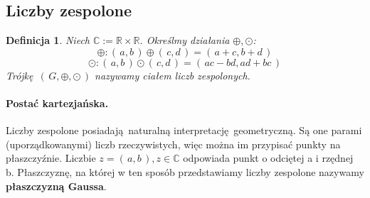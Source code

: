 \documentclass{article}
\newtheorem{definition}{Definicja}[section]
\begin{document}
    \subsection{Liczby zespolone}
    \begin{definition}
        Niech $\mathds{C} := \mathds{R} \times \mathds{R}$. Określmy działania $\oplus ,\odot$:
        \begin{equation*}
            \oplus : (\,a,b\,)\oplus(\,c,d\,) = (\,a+c, b+d\,)
        \end{equation*}
        \begin{equation*}
            \odot : (\,a,b\,)\odot(\,c,d\,) = (\, ac-bd, ad+bc\,)
        \end{equation*}
        Trójkę $(\,G,\oplus,\odot\,)$ nazywamy ciałem liczb zespolonych.
    \end{definition}

    \paragraph{Postać kartezjańska.} Liczby zespolone posiadają naturalną interpretację geometryczną. Są one parami (uporządkowanymi) liczb rzeczywistych, więc można im przypisać punkty na płaszczyźnie. Liczbie $z = (\,a,b\,), z \in \mathds{C}$ odpowiada punkt o odciętej a i rzędnej b. Płaszczyznę, na której w ten sposób przedstawiamy liczby zespolone nazywamy \textbf{płaszczyzną Gaussa}.
    \begin{center}
    \end{center}
\end{document}
